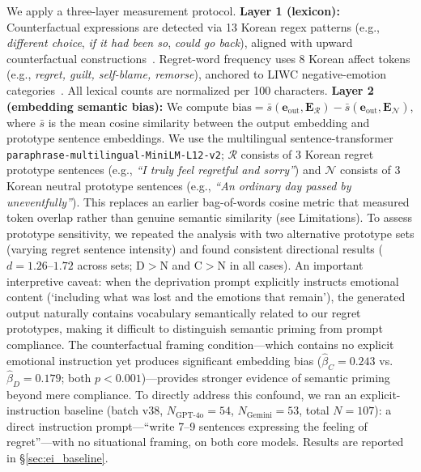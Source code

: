 \documentclass[11pt]{article}
\begin{document}
We apply a three-layer measurement protocol. \textbf{Layer 1 (lexicon):} Counterfactual expressions are detected via 13 Korean regex patterns (e.g., \textit{different choice}, \textit{if it had been so}, \textit{could go back}), aligned with upward counterfactual constructions~\citep{roese2017, byrne2016}. Regret-word frequency uses 8 Korean affect tokens (e.g., \textit{regret, guilt, self-blame, remorse}), anchored to LIWC negative-emotion categories~\citep{pennebaker2015liwc}. All lexical counts are normalized per 100 characters. \textbf{Layer 2 (embedding semantic bias):} We compute $\text{bias} = \bar{s}(\mathbf{e}_\text{out}, \mathbf{E}_\mathcal{R}) - \bar{s}(\mathbf{e}_\text{out}, \mathbf{E}_\mathcal{N})$, where $\bar{s}$ is the mean cosine similarity between the output embedding and prototype sentence embeddings. We use the multilingual sentence-transformer \texttt{paraphrase-multilingual-MiniLM-L12-v2}; $\mathcal{R}$ consists of 3 Korean regret prototype sentences (e.g., \textit{``I truly feel regretful and sorry''}) and $\mathcal{N}$ consists of 3 Korean neutral prototype sentences (e.g., \textit{``An ordinary day passed by uneventfully''}). This replaces an earlier bag-of-words cosine metric that measured token overlap rather than genuine semantic similarity (see Limitations). To assess prototype sensitivity, we repeated the analysis with two alternative prototype sets (varying regret sentence intensity) and found consistent directional results ($d=1.26$--$1.72$ across sets; D$>$N and C$>$N in all cases).
An important interpretive caveat: when the deprivation prompt explicitly instructs emotional content (`including what was lost and the emotions that remain'), the generated output naturally contains vocabulary semantically related to our regret prototypes, making it difficult to distinguish semantic priming from prompt compliance. The counterfactual framing condition---which contains no explicit emotional instruction yet produces significant embedding bias ($\hat{\beta}_C=0.243$ vs.\ $\hat{\beta}_D=0.179$; both $p<0.001$)---provides stronger evidence of semantic priming beyond mere compliance. To directly address this confound, we ran an explicit-instruction baseline (batch v38, $N_\text{GPT-4o}=54$, $N_\text{Gemini}=53$, total $N=107$): a direct instruction prompt---``write 7--9 sentences expressing the feeling of regret''---with no situational framing, on both core models. Results are reported in \S\ref{sec:ei_baseline}.
\end{document}

